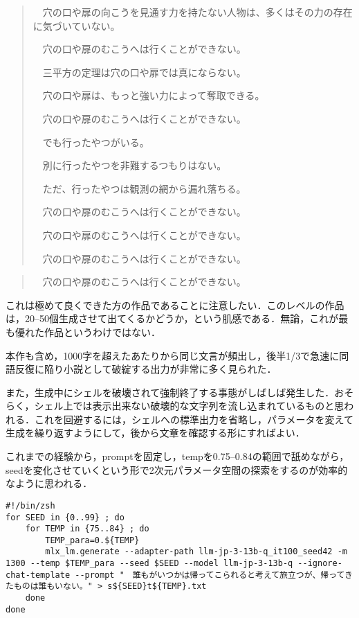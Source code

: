 \documentclass[10pt, a5paper, twoside]{jsarticle}
\theoremstyle{definition}
\begin{document}
		\begin{quote}
			　穴の口や扉の向こうを見通す力を持たない人物は、多くはその力の存在に気づいていない。

			　穴の口や扉のむこうへは行くことができない。

			　三平方の定理は穴の口や扉では真にならない。

			　穴の口や扉は、もっと強い力によって奪取できる。

			　穴の口や扉のむこうへは行くことができない。

			　でも行ったやつがいる。

			　別に行ったやつを非難するつもりはない。

			　ただ、行ったやつは観測の網から漏れ落ちる。

			　穴の口や扉のむこうへは行くことができない。

			　穴の口や扉のむこうへは行くことができない。

			　穴の口や扉のむこうへは行くことができない。
		\end{quote}

		\begin{quote}
			　穴の口や扉のむこうへは行くことができない。
		\end{quote}

		\clearpage

		これは極めて良くできた方の作品であることに注意したい．このレベルの作品は，20--50個生成させて出てくるかどうか，という肌感である．無論，これが最も優れた作品というわけではない．

		本作も含め，1000字を超えたあたりから同じ文言が頻出し，後半1/3で急速に同語反復に陥り小説として破綻する出力が非常に多く見られた．

		また，生成中にシェルを破壊されて強制終了する事態がしばしば発生した．おそらく，シェル上では表示出来ない破壊的な文字列を流し込まれているものと思われる．これを回避するには，シェルへの標準出力を省略し，パラメータを変えて生成を繰り返すようにして，後から文章を確認する形にすればよい．

		これまでの経験から，promptを固定し，tempを0.75--0.84の範囲で舐めながら，seedを変化させていくという形で2次元パラメータ空間の探索をするのが効率的なように思われる．

		\begin{mdframed}
			\begin{verbatim}
#!/bin/zsh
for SEED in {0..99} ; do
    for TEMP in {75..84} ; do
        TEMP_para=0.${TEMP}
        mlx_lm.generate --adapter-path llm-jp-3-13b-q_it100_seed42 -m 1300 --temp $TEMP_para --seed $SEED --model llm-jp-3-13b-q --ignore-chat-template --prompt "　誰もがいつかは帰ってこられると考えて旅立つが、帰ってきたものは誰もいない。" > s${SEED}t${TEMP}.txt
    done
done
			\end{verbatim}
		\end{mdframed}
\end{document}

